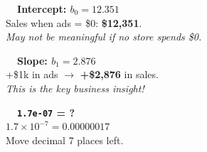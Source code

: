 \documentclass[11pt]{article}
\begin{document}
\vspace{4pt}

\begin{minipage}[t]{0.35\textwidth}
\begin{tcolorbox}[colback=lightgreen, colframe=mygreen!60, arc=4pt, boxrule=0.6pt,
  left=6pt, right=6pt, top=5pt, bottom=5pt]
\small
{\bfseries\color{mygreen}\faCalculator\ \ Intercept: $b_0 = 12.351$}\\[2pt]
\footnotesize
Sales when ads = \$0: \textbf{\$12,351}.\\
{\scriptsize\itshape\color{darkgray2} May not be meaningful if no store spends \$0.}
\end{tcolorbox}
\end{minipage}\hfill
\begin{minipage}[t]{0.35\textwidth}
\begin{tcolorbox}[colback=lightorange, colframe=myorange!60, arc=4pt, boxrule=0.6pt,
  left=6pt, right=6pt, top=5pt, bottom=5pt]
\small
{\bfseries\color{myorange}\faArrowUp\ \ Slope: $b_1 = 2.876$}\\[2pt]
\footnotesize
+\$1k in ads $\rightarrow$ \textbf{+\$2,876} in sales.\\
{\scriptsize\itshape\color{darkgray2} This is the key business insight!}
\end{tcolorbox}
\end{minipage}\hfill
\begin{minipage}[t]{0.27\textwidth}
\begin{tcolorbox}[colback=lightgold, colframe=gold!60, arc=4pt, boxrule=0.6pt,
  left=6pt, right=6pt, top=5pt, bottom=5pt]
\small
{\bfseries\color{gold!80!black}\faInfoCircle\ \ \texttt{1.7e-07} = ?}\\[2pt]
\footnotesize
$1.7 \times 10^{-7} = 0.00000017$\\
{\scriptsize\color{darkgray2} Move decimal 7 places left.}
\end{tcolorbox}
\end{minipage}
\end{document}
